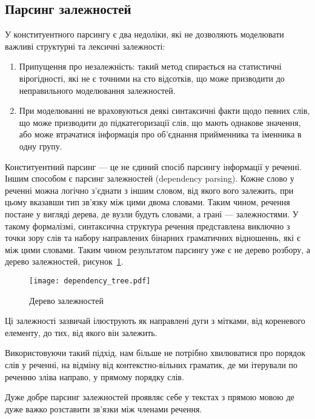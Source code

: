 \subsection{Парсинг залежностей}
У конституентного парсингу є два недоліки, які не дозволяють
моделювати важливі структурні та лексичні залежності:
\begin{enumerate}
    \item Припущення про незалежність: такий метод спирається на статистичні
    вірогідності, які не є точними на сто відсотків, що може призводити до
    неправильного моделювання залежностей.
    \item При моделюванні не враховуються деякі синтаксичні факти щодо певних слів,
    що може призводити до підкатегоризації слів, що мають однакове значення,
    або може втрачатися інформація про об'єднання прийменника та іменника
    в одну групу.
\end{enumerate}

Конституентний парсинг --- це не єдиний спосіб парсингу інформації у реченні.
Іншим способом є парсинг залежностей (dependency parsing). Кожне слово у
реченні можна логічно з'єднати з іншим словом, від якого вого залежить,
при цьому вказавши тип зв'язку між цими двома словами. Таким чином, речення
постане у вигляді дерева, де вузли будуть словами, а грані --- залежностями.
У такому формалізмі, синтаксична структура речення представлена
виключно з точки зору слів та набору направлених бінарних граматичних відношеннь,
які є між цими словами. Таким чином результатом парсингу уже є не дерево розбору,
а дерево залежностей, рисунок~\ref{img:dependency_tree}.
\begin{figure}[ht]
  \begin{center}
    \texttt{[image: dependency\_tree.pdf]}
  \end{center}
  \caption{Дерево залежностей}
  \label{img:dependency_tree}
\end{figure}

Ці залежності зазвичай ілюструють як направлені дуги з мітками, від кореневого
елементу, до тих, від якого він залежить.

Використовуючи такий підхід, нам більше не потрібно хвилюватися про
порядок слів у реченні, на відміну від контекстно-вільних граматик, де ми
ітерували по реченню зліва направо, у прямому порядку слів.

Дуже добре парсинг залежностей проявляє себе у текстах з прямою мовою
де дуже важко розставити зв'язки між членами речення.

